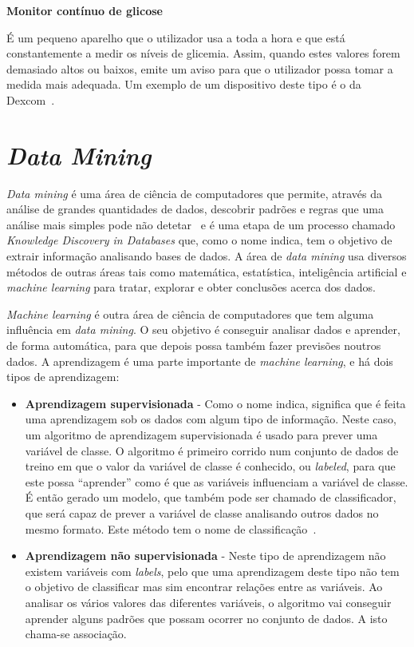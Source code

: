 \textbf{Monitor contínuo de glicose}

É um pequeno aparelho que o utilizador usa a toda a hora e que está constantemente a medir os níveis de glicemia. Assim, quando estes valores forem demasiado altos ou baixos, emite um aviso para que o utilizador possa tomar a medida mais adequada. Um exemplo de um dispositivo deste tipo é o da Dexcom~\cite{cgm}.


\section{\textit{Data Mining}}

\textit{Data mining} é uma área de ciência de computadores que permite, através da análise de grandes quantidades de dados, descobrir padrões e regras que uma análise mais simples pode não detetar~\cite{oracle} e é uma etapa de um processo chamado \textit{Knowledge Discovery in Databases} que, como o nome indica, tem o objetivo de extrair informação analisando bases de dados.
A área de \textit{data mining} usa diversos métodos de outras áreas tais como matemática, estatística, inteligência artificial e \textit{machine learning} para tratar, explorar e obter conclusões acerca dos dados. 

\textit{Machine learning} é outra área de ciência de computadores que tem alguma influência em \textit{data mining}. O seu objetivo é conseguir analisar dados e aprender, de forma automática, para que depois possa também fazer previsões noutros dados. A aprendizagem é uma parte importante de \textit{machine learning}, e há dois tipos de aprendizagem:

\begin{itemize}
\item \textbf{Aprendizagem supervisionada} - Como o nome indica, significa que é feita uma aprendizagem sob os dados com algum tipo de informação. Neste caso, um algoritmo de aprendizagem supervisionada é usado para prever uma variável de classe. O algoritmo é primeiro corrido num conjunto de dados de treino em que o valor da variável de classe é conhecido, ou \textit{labeled}, para que este possa ``aprender'' como é que as variáveis influenciam a variável de classe. É então gerado um modelo, que também pode ser chamado de classificador, que será capaz de prever a variável de classe analisando outros dados no mesmo formato. Este método tem o nome de classificação~\cite{supervised}.

\item \textbf{Aprendizagem não supervisionada} - Neste tipo de aprendizagem não existem variáveis com \textit{labels}, pelo que uma aprendizagem deste tipo não tem o objetivo de classificar mas sim encontrar relações entre as variáveis. Ao analisar os vários valores das diferentes variáveis, o algoritmo vai conseguir aprender alguns padrões que possam ocorrer no conjunto de dados. A isto chama-se associação.
\end{itemize}

